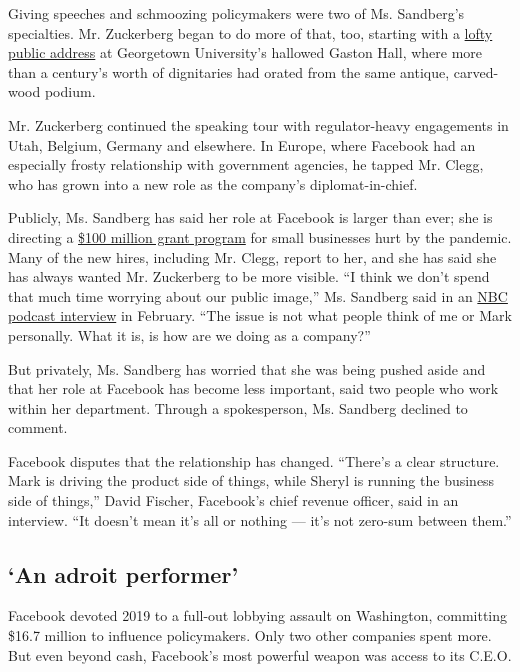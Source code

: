 Giving speeches and schmoozing policymakers were two of Ms. Sandberg's
specialties. Mr. Zuckerberg began to do more of that, too, starting with
a
\href{https://www.nytimes.com/2019/10/17/business/zuckerberg-facebook-free-speech.html}{lofty
public address} at Georgetown University's hallowed Gaston Hall, where
more than a century's worth of dignitaries had orated from the same
antique, carved-wood podium.

Mr. Zuckerberg continued the speaking tour with regulator-heavy
engagements in Utah, Belgium, Germany and elsewhere. In Europe, where
Facebook had an especially frosty relationship with government agencies,
he tapped Mr. Clegg, who has grown into a new role as the company's
diplomat-in-chief.

Publicly, Ms. Sandberg has said her role at Facebook is larger than
ever; she is directing a
\href{https://www.facebook.com/business/boost/grants}{\$100 million
grant program} for small businesses hurt by the pandemic. Many of the
new hires, including Mr. Clegg, report to her, and she has said she has
always wanted Mr. Zuckerberg to be more visible. ``I think we don't
spend that much time worrying about our public image,'' Ms. Sandberg
said in an
\href{https://www.nbcnews.com/podcast/byers-market/transcript-facebook-s-sheryl-sandberg-n1145051}{NBC
podcast interview} in February. ``The issue is not what people think of
me or Mark personally. What it is, is how are we doing as a company?''

But privately, Ms. Sandberg has worried that she was being pushed aside
and that her role at Facebook has become less important, said two people
who work within her department. Through a spokesperson, Ms. Sandberg
declined to comment.

Facebook disputes that the relationship has changed. ``There's a clear
structure. Mark is driving the product side of things, while Sheryl is
running the business side of things,'' David Fischer, Facebook's chief
revenue officer, said in an interview. ``It doesn't mean it's all or
nothing --- it's not zero-sum between them.''

\hypertarget{an-adroit-performer}{%
\subsection{`An adroit performer'}\label{an-adroit-performer}}

Facebook devoted 2019 to a full-out lobbying assault on Washington,
committing \$16.7 million to influence policymakers. Only two other
companies spent more. But even beyond cash, Facebook's most powerful
weapon was access to its C.E.O.

